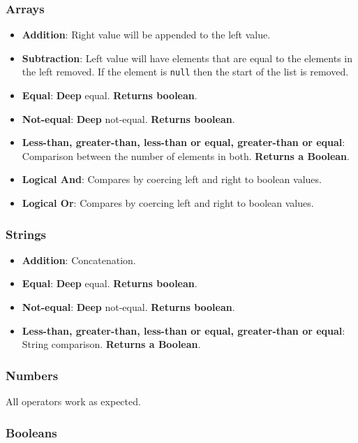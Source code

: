 \documentclass[12pt, letterpaper]{article}
\begin{document}
\subsubsection{Arrays}

\begin{itemize}
    \item \textbf{Addition}: Right value will be appended to the left value.
    \item \textbf{Subtraction}: Left value will have elements that are equal to the elements in the left removed. If the element is \verb|null| then the start of the list is removed.
    \item \textbf{Equal}: \textbf{Deep} equal. \textbf{Returns boolean}.
    \item \textbf{Not-equal}: \textbf{Deep} not-equal. \textbf{Returns boolean}.
    \item \textbf{Less-than, greater-than, less-than or equal, greater-than or equal}: Comparison between the number of elements in both. \textbf{Returns a Boolean}.
    \item \textbf{Logical And}: Compares by coercing left and right to boolean values.
    \item \textbf{Logical Or}: Compares by coercing left and right to boolean values.
\end{itemize}

\subsubsection{Strings}

\begin{itemize}
    \item \textbf{Addition}: Concatenation.
    \item \textbf{Equal}: \textbf{Deep} equal. \textbf{Returns boolean}.
    \item \textbf{Not-equal}: \textbf{Deep} not-equal. \textbf{Returns boolean}.
    \item \textbf{Less-than, greater-than, less-than or equal, greater-than or equal}: String comparison. \textbf{Returns a Boolean}.
\end{itemize}

\subsubsection{Numbers}

All operators work as expected.

\subsubsection{Booleans}
\end{document}
